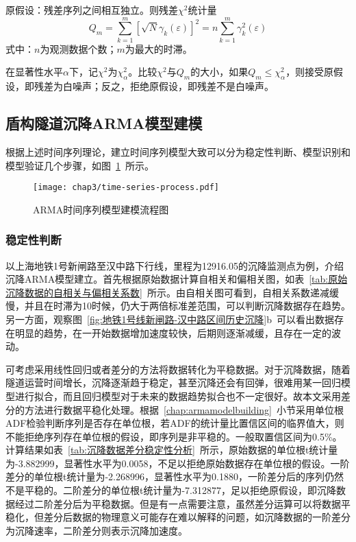 原假设：残差序列之间相互独立。则残差${{\chi }^{2}}$统计量
\begin{equation}
	{{Q}_{m}}=\sum\limits_{k=1}^{m}{{{\left[ \sqrt{N}{{\gamma }_{k}}(\varepsilon ) \right]}^{2}}=n\sum\limits_{k=1}^{m}{\gamma _{k}^{2}(\varepsilon )}}
\end{equation}
式中：$n$为观测数据个数；$m$为最大的时滞。

在显著性水平$\alpha $下，记${{\chi }^{2}}$为$\chi _{\alpha }^{2}$。比较${{\chi }^{2}}$与$Q_m$的大小，如果${{Q}_{m}}\le \chi _{\alpha }^{2}$，则接受原假设，即残差为白噪声；反之，拒绝原假设，即残差不是白噪声。


\subsection{盾构隧道沉降ARMA模型建模}
\label{chap:armatunnel}

根据上述时间序列理论，建立时间序列模型大致可以分为稳定性判断、模型识别和模型验证几个步骤，如图~\ref{fig:ARMA时间序列模型建模流程图}~所示。

\begin{figure}[htb!]
    \centering
    \texttt{[image: chap3/time-series-process.pdf]}
    \caption{ARMA时间序列模型建模流程图}
    \label{fig:ARMA时间序列模型建模流程图}
\end{figure}

\subsubsection{稳定性判断}

以上海地铁1号新闸路至汉中路下行线，里程为12916.05的沉降监测点为例，介绍沉降ARMA模型建立。首先根据原始数据计算自相关和偏相关图，如表~\ref{tab:原始沉降数据的自相关与偏相关系数}~所示。由自相关图可看到，自相关系数递减缓慢，并且在时滞为10时候，仍大于两倍标准差范围，可以判断沉降数据存在趋势。另一方面，观察图~\ref{fig:地铁1号线新闸路-汉中路区间历史沉降}b~可以看出数据存在明显的趋势，在一开始数据增加速度较快，后期则逐渐减缓，且存在一定的波动。

可考虑采用线性回归或者差分的方法将数据转化为平稳数据。对于沉降数据，随着隧道运营时间增长，沉降逐渐趋于稳定，甚至沉降还会有回弹，很难用某一回归模型进行拟合，而且回归模型对于未来的数据趋势拟合也不一定很好。故本文采用差分的方法进行数据平稳化处理。根据~\ref{chap:armamodelbuilding}~小节采用单位根ADF检验判断序列是否存在单位根，若ADF的统计量比置信区间的临界值大，则不能拒绝序列存在单位根的假设，即序列是非平稳的。一般取置信区间为0.5\%。计算结果如表~\ref{tab:沉降数据差分稳定性分析}~所示，原始数据的单位根t统计量为-3.882999，显著性水平为0.0058，不足以拒绝原始数据存在单位根的假设。一阶差分的单位根t统计量为-2.268996，显著性水平为0.1880，一阶差分后的序列仍然不是平稳的。二阶差分的单位根t统计量为-7.312877，足以拒绝原假设，即沉降数据经过二阶差分后为平稳数据。但是有一点需要注意，虽然差分运算可以将数据平稳化，但差分后数据的物理意义可能存在难以解释的问题，如沉降数据的一阶差分为沉降速率，二阶差分则表示沉降加速度。

